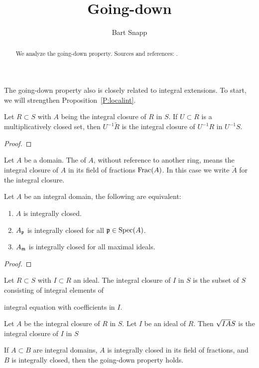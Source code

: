 \documentclass{ximera}
\author{Bart Snapp}
\title{Going-down}
\begin{document}
\begin{abstract}
  We analyze the going-down property. Sources and references:
  \cite{AM1969}.
\end{abstract}
\maketitle

The going-down property also is closely related to integral
extensions. To start, we will strengthen Proposition~\ref{P:localint}.


\begin{proposition}
  Let $R\subset S$ with $A$ being the integral closure of $R$
  in $S$. If $U\subset R$ is a multiplicatively closed set, then
  $U^{-1}\tilde{R}$ is the integral closure of $U^{-1}R$ in $U^{-1}S$.
  \begin{proof}
  \end{proof}
\end{proposition}


\begin{definition}
  Let $A$ be a domain. The  of $A$, without
  reference to another ring, means the integral closure of $A$ in its
  field of fractions $\operatorname{Frac}(A)$. In this case we write $\tilde{A}$ for
  the integral closure.
\end{definition}



\begin{proposition}
  Let $A$ be an integral domain, the following are equivalent:
  \begin{enumerate}
  \item $A$ is integrally closed.
  \item $A_{\mathfrak{p}}$ is integrally closed for all $\mathfrak{p}\in\operatorname{Spec}(A)$.
  \item $A_{\mathfrak{m}}$ is integrally closed for all maximal ideals.
  \end{enumerate}
  \begin{proof}
  \end{proof}
\end{proposition}


\begin{definition}
   Let $R\subset S$ with $I\subset R$ an ideal. The integral closure
   of $I$ in $S$ is the subset of $S$ consisting of integral elements of

   integral equation with coefficients in $I$.
\end{definition}


\begin{proposition}
  Let $A$ be the integral closure of $R$ in $S$. Let $I$ be an ideal
  of $R$. Then $\sqrt{IA}S$ is the integral closure of $I$  in $S$  
\end{proposition}


\begin{proposition}
\end{proposition}


\begin{theorem}
  If $A\subset B$ are integral domains, $A$ is integrally closed in
  its field of fractions, and $B$ is integrally closed, then the
  going-down property holds.
\end{theorem}
\end{document}
